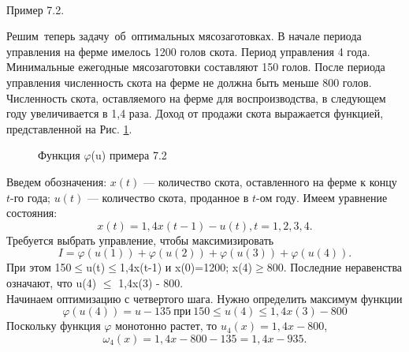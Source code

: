 \\
\indent \begin{bfseries}Пример 7.2.\end{bfseries} Решим~теперь задачу~об~оптимальных мясозаготовках. В начале периода управления на ферме имелось 1200 голов скота. Период управления 4 года. Минимальные ежегодные мясозаготовки составляют 150 голов. После периода управления численность скота на ферме не должна быть меньше 800 голов. Численность скота, оставляемого на ферме для воспроизводства, в следующем году увеличивается в 1,4 раза. Доход от продажи скота выражается функцией, представленной на Рис. \ref{picture_7_4}.
\begin{figure}[h]
\caption{Функция $\varphi$(u) примера 7.2}
\label{picture_7_4}
\end{figure}
\indent Введем обозначения:
$x(t)$ — количество скота, оставленного на ферме к концу $t$-го года;
$u(t)$ — количество скота, проданное в $t$-ом году.
\indent Имеем уравнение состояния:
 \begin{equation*}
x(t)=1,4x(t-1)-u(t), t=1,2,3,4.
\end{equation*}
\indent Требуется выбрать управление, чтобы максимизировать
\begin{equation*}
I = \varphi(u(1))+\varphi(u(2))+\varphi(u(3))+\varphi(u(4)).
\end{equation*}
\indent При этом 150$\le$u(t)$\le$1,4x(t-1) и x(0)=1200; x(4)$\ge$800. Последние неравенства означают, что  u(4) $\le$ 1,4x(3) - 800. \\
\indent Начинаем оптимизацию с четвертого шага. Нужно определить максимум функции
\begin{equation*}
\varphi(u(4))  = u-135 \:\text{при}\:150 \le u(4) \le 1,4x(3)-800
\end{equation*}
\indent Поскольку функция $\varphi$ монотонно растет, то $u_4(x)=1,4x-800$,
 \begin{equation*}
\omega_4(x)  =  1,4x - 800 - 135 = 1,4x - 935.
\end{equation*}
